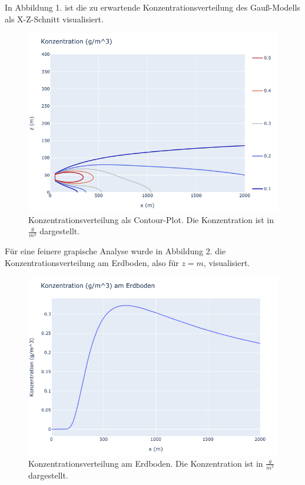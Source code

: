 \documentclass[ngerman]{scrartcl}
\begin{document}
In Abbildung 1. ist die zu erwartende Konzentrationsverteilung des Gauß-Modells als X-Z-Schnitt visualisiert.
\begin{figure}[H]
	\centering
	\includegraphics[scale=0.5]{Bilder/1a.png}
	\caption{Konzentrationsverteilung als Contour-Plot. Die Konzentration ist in $\frac{\si{g}}{\si{m^3}}$ dargestellt. }
	\label{fig:my_label}
\end{figure}

Für eine feinere grapische Analyse wurde in Abbildung 2. die Konzentrationsverteilung am Erdboden, also für $z=\si{m}$, visualisiert.
\begin{figure}[H]
	\centering
	\includegraphics[scale=0.5]{Bilder/1b.png}
	\caption{Konzentrationsverteilung am Erdboden.  Die Konzentration ist in $\frac{\si{g}}{\si{m^3}}$ dargestellt.}
	\label{fig:my_label}
\end{figure}
\end{document}
